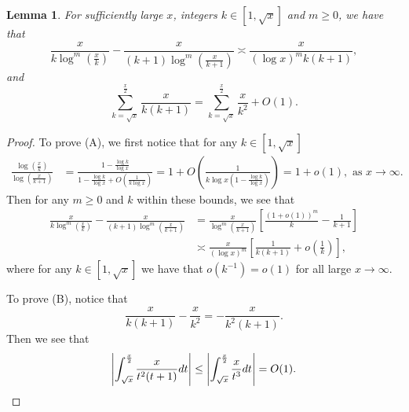 \documentclass[11pt,reqno,a4letter]{article}
\numberwithin{figure}{section}
\numberwithin{table}{section}
\theoremstyle{plain}
\newtheorem{lemma}[theorem]{Lemma}
\numberwithin{theorem}{section}
\theoremstyle{definition}
\begin{document}
\begin{lemma}
\label{lemma_PrimePix_ErrorBoundDiffs_SimplifyingConditions_v1} 
For sufficiently large $x$, integers $k \in \left[1, \sqrt{x}\right]$ and 
$m \geq 0$, we have that 
\begin{equation} 
\tag{A} 
\frac{x}{k \log^m\left(\frac{x}{k}\right)} - 
     \frac{x}{(k+1) \log^m\left(\frac{x}{k+1}\right)}
     \asymp \frac{x}{(\log x)^m k(k+1)}, 
\end{equation} 
and 
\begin{equation} 
\tag{B} 
\sum_{k=\sqrt{x}}^{\frac{x}{2}} \frac{x}{k(k+1)} = 
     \sum_{k=\sqrt{x}}^{\frac{x}{2}} \frac{x}{k^2} + O(1). 
\end{equation} 
\end{lemma} 
\begin{proof} 
To prove (A), we first notice that for any $k \in \left[1, \sqrt{x}\right]$ 
\begin{align*}
\frac{\log\left(\frac{x}{k}\right)}{\log\left(\frac{x}{k+1}\right)} & = 
     \frac{1 - \frac{\log k}{\log x}}{1 - \frac{\log k}{\log x} + O\left(\frac{1}{k\log x}\right)} 
     = 1 + O\left(\frac{1}{k\log x\left(1 - \frac{\log k}{\log x}\right)}\right) 
     = 1 + o(1), \text{\ as\ } x \rightarrow \infty. 
\end{align*}
Then for any $m \geq 0$ and $k$ within these bounds, we see that 
\begin{align*}
\frac{x}{k \log^m\left(\frac{x}{k}\right)} - 
     \frac{x}{(k+1) \log^m\left(\frac{x}{k+1}\right)} & = \frac{x}{\log^m\left(\frac{x}{k+1}\right)} \left[ 
     \frac{(1+o(1))^m}{k} - \frac{1}{k+1}\right] \\ 
     & \asymp \frac{x}{(\log x)^m} \left[\frac{1}{k(k+1)} + o\left(\frac{1}{k}\right)\right], 
\end{align*}
where for any $k \in \left[1, \sqrt{x}\right]$ we have that 
$o\left(k^{-1}\right) = o(1)$ for all large $x \rightarrow \infty$. 

To prove (B), notice that 
\[
\frac{x}{k(k+1)} - \frac{x}{k^2} = -\frac{x}{k^2(k+1)}. 
\]
Then we see that 
\[
\left\lvert \int_{\sqrt{x}}^{\frac{x}{2}} \frac{x}{t^2(t+1)} dt \right\rvert \leq 
     \left\lvert \int_{\sqrt{x}}^{\frac{x}{2}} \frac{x}{t^3} dt \right\rvert = O(1). 
     \qedhere 
\]
\end{proof} 
\end{document}
